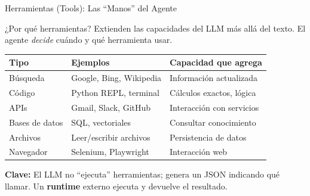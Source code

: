 \documentclass[aspectratio=169]{beamer}
\begin{document}
\begin{frame}{Herramientas (Tools): Las ``Manos'' del Agente}
    \begin{block}{¿Por qué herramientas?}
        Extienden las capacidades del LLM más allá del texto. El agente \textit{decide} cuándo y qué herramienta usar.
    \end{block}
    
    \vspace{0.2cm}
    \begin{table}[]
        \centering
        \renewcommand{\arraystretch}{1.2}
        \scriptsize
        \begin{tabular}{p{2.5cm} p{4.5cm} p{4.5cm}}
            \toprule
            \textbf{Tipo} & \textbf{Ejemplos} & \textbf{Capacidad que agrega} \\
            \midrule
            Búsqueda & Google, Bing, Wikipedia & Información actualizada \\
            Código & Python REPL, terminal & Cálculos exactos, lógica \\
            APIs & Gmail, Slack, GitHub & Interacción con servicios \\
            Bases de datos & SQL, vectoriales & Consultar conocimiento \\
            Archivos & Leer/escribir archivos & Persistencia de datos \\
            Navegador & Selenium, Playwright & Interacción web \\
            \bottomrule
        \end{tabular}
    \end{table}
    
    \vspace{0.2cm}
    \textbf{Clave:} El LLM no ``ejecuta'' herramientas; genera un JSON indicando qué llamar. Un \textbf{runtime} externo ejecuta y devuelve el resultado.
\end{frame}
\end{document}
